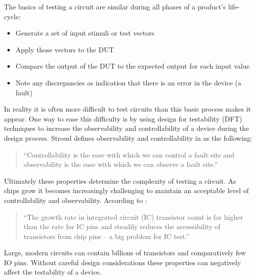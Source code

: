 \documentclass[12pt]{report}
\begin{document}
The basics of testing a circuit are similar during all phases of a product's life-cycle:
\begin{itemize}
\item Generate a set of input stimuli or test vectors
\item Apply those vectors to the DUT
\item Compare the output of the DUT to the expected output for each input value
\item Note any discrepancies as indication that there is an error in the device (a fault)
\end{itemize}
In reality it is often more difficult to test circuits than this basic process makes it appear.  One way to ease this difficulty is by using design for testability (DFT) techniques to increase the observability and controllability of a device during the design process\cite{stroud}.  Stroud defines observability and controllability in \cite{stroud} as the following:
\begin{quote}
``Controllability is the ease with which we can control a fault site and observability is the ease with which we can observe a fault site.\cite{stroud}''
\end{quote}
Ultimately these properties determine the complexity of testing a circuit.  As chips grow it becomes increasingly challenging to maintain an acceptable level of controllability and observability.  According to \cite{zorian}: 
\begin{quote}
``The growth rate in integrated circuit (IC) transistor count is far higher than the rate for IC pins and steadily reduces the accessibility of transistors from chip pins -- a big problem for IC test.\cite{zorian}''
\end{quote}
Large, modern circuits can contain billions of transistors and comparatively few IO pins\cite{zorian}.  Without careful design considerations these properties can negatively affect the testability of a device\cite{stroud}.
\end{document}
